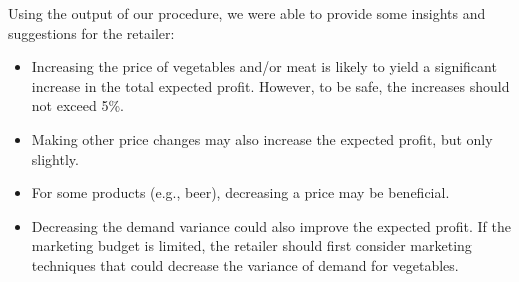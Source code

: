 \documentclass[a4paper,11pt]{article}
\begin{document}
\begin{table}[htb]
\centering
\caption{Margins of profit and Bounds for ranges of validity in \%}
\label{tab:real_sum}
\end{table}

Using the output of our procedure, we were able to provide some insights and suggestions for the retailer:
\begin{itemize}
\item Increasing the price of vegetables and/or meat is likely to yield a significant increase in the total expected profit. However, to be safe, the increases should not exceed 5\%.
\item Making other price changes may also increase the expected profit, but only slightly.
\item For some products (e.g., beer), decreasing a price may be beneficial.
\item Decreasing the demand variance could also improve the expected profit. If the marketing budget is limited, the retailer should first consider marketing techniques that could decrease the variance of demand for vegetables.
\end{itemize}
\end{document}
